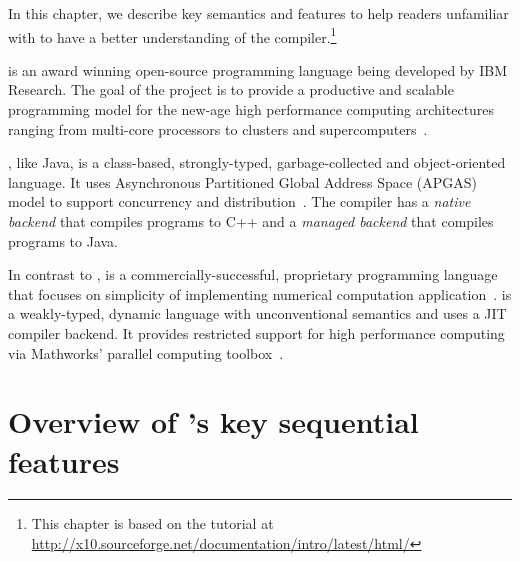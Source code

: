 
In this chapter, we describe key \xten semantics and features to help readers 
unfamiliar with \xten to
have a better understanding of the \mixten compiler.\footnote{This chapter is
based on the tutorial at
\url{http://x10.sourceforge.net/documentation/intro/latest/html/}}   

\xten is an award winning open-source programming language being developed by
IBM Research. The goal of the \xten project is to provide a productive and
scalable programming model for the new-age high performance computing
architectures ranging from multi-core processors to clusters and
supercomputers~\cite{x10}. 

\xten, like Java, is a class-based, strongly-typed, garbage-collected and
object-oriented language. It uses Asynchronous Partitioned Global Address 
Space (APGAS)
model to support concurrency and distribution~\cite{specs}. The \xten compiler has a
\emph{native backend} that compiles \xten programs to C++ and a 
\emph{managed backend} that
compiles \xten programs to Java. 

In contrast to \xten, \matlab is a commercially-successful, proprietary
programming language that focuses on simplicity of implementing numerical
computation application~\cite{MatlabGrowth}. \matlab is a weakly-typed, dynamic language
with unconventional semantics and uses a JIT compiler backend.
It provides restricted support for high performance
computing via Mathworks' parallel computing toolbox~\cite{pct}. 

\section{Overview of \xten's key sequential features}

